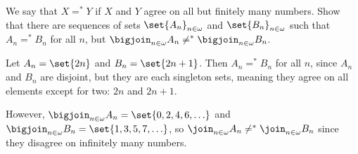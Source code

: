 \begin{problem}
  We say that $X =^\ast Y$ if $X$ and $Y$ agree on all but
  finitely many numbers.
  Show that there are sequences of sets
  $\set{A_n}_{n \in \omega}$ and $\set{B_n}_{n \in \omega}$
  such that $A_n =^\ast B_n$ for all $n$,
  but $\displaystyle \bigjoin_{n \in \omega} A_n \not=^\ast \bigjoin_{n \in \omega} B_n$.

  \begin{answer}
    Let $A_n = \set{2n}$ and $B_n = \set{2n+1}$.
    Then $A_n =^\ast B_n$ for all $n$,
    since $A_n$ and $B_n$ are disjoint,
    but they are each singleton sets,
    meaning they agree on all elements except for two:
    $2n$ and $2n+1$.

    \step
    However, $\displaystyle\bigjoin_{n \in \omega} A_n = \set{0, 2, 4, 6, \ldots}$
    and $\displaystyle\bigjoin_{n \in \omega} B_n = \set{1, 3, 5, 7, \ldots}$,
    so $\join_{n \in \omega} A_n \not=^\ast \join_{n \in \omega} B_n$
    since they disagree on infinitely many numbers.
  \end{answer}
\end{problem}
